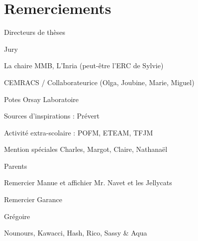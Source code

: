 \chapter{Remerciements}

Directeurs de thèses \par

Jury \par

La chaire MMB, L'Inria (peut-être l'ERC de Sylvie)

CEMRACS / Collaborateurice
(Olga, Joubine, Marie, Miguel)

Potes Orsay
Laboratoire

Sources d'inspirations : Prévert

Activité extra-scolaire : POFM, ETEAM, TFJM

Mention spéciales Charles, Margot, Claire, Nathanaël

Parents \par

Remercier Manue et affichier Mr. Navet et les Jellycats \par

Remercier Garance \par

Grégoire

Nounours, Kawacci, Hash, Rico, Sassy \& Aqua 

